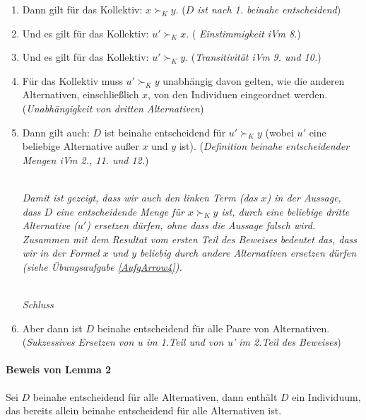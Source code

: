 \begin{enumerate}
  \item Dann gilt für das Kollektiv: $x \succ_K y$. ({\em $D$ ist nach
  1. beinahe entscheidend})
  
  \item Und es gilt für das Kollektiv: $u' \succ_K x$. ({\em
  Einstimmigkeit iVm 8.})
  
  \item Und es gilt für das Kollektiv: $u' \succ_K y$. ({\em Transitivität iVm
  9. und 10.})

  \item Für das Kollektiv muss $u' \succ_K y$ unabhängig davon gelten, wie die
  anderen Alternativen, einschließlich $x$, von den Individuen eingeordnet
  werden. ({\em Unabhängigkeit von dritten Alternativen})  

  \item \label{KleineBeweisAufgabe} Dann gilt auch: $D$ ist beinahe entscheidend
  für $u' \succ_K y$ (wobei $u'$ eine beliebige Alternative außer $x$ und $y$
  ist). ({\em Definition beinahe entscheidender Mengen iVm 2., 11. und 12.})  

    ~\\{\em Damit ist gezeigt, dass wir auch den {\em linken} Term (das $x$)
    in der Aussage, dass $D$ eine entscheidende Menge für $x \succ_K y$ ist,
    durch eine beliebige dritte Alternative ($u'$) ersetzen dürfen, ohne dass die
    Aussage falsch wird. Zusammen mit dem Resultat vom ersten Teil des
    Beweises bedeutet das, dass wir in der Formel $x$ und $y$ beliebig
    durch andere Alternativen ersetzen dürfen (siehe Übungsaufgabe
    \ref{AufgArrow4}).}
   
    ~\\{\em Schluss}

  \item Aber dann ist $D$ beinahe entscheidend für alle Paare von Alternativen.
  ({\em Sukzessives Ersetzen von {\em u} im 1.Teil und von {\em u'} im 
  2.Teil des Beweises})
\end{enumerate}


\paragraph{Beweis von Lemma 2} Sei $D$ beinahe entscheidend für alle
  Alternativen, dann enthält $D$ ein Individuum, das bereits
  allein beinahe entscheidend für alle Alternativen ist.

